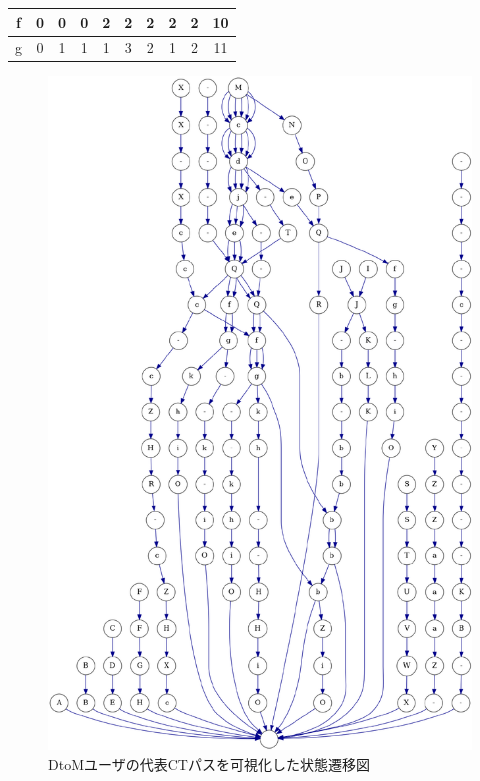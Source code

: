 \documentclass[submit,ses,noauthor]{ipsj}
\begin{document}
\begin{table}[h]
\begin{minipage}[t]{0.55\linewidth}
\begin{tabular}{c|c|cccccccc}
f                   & 0                                           & \multicolumn{1}{c|}{0} & \multicolumn{1}{c|}{0} & \multicolumn{1}{c|}{2} & \multicolumn{1}{c|}{2} & \multicolumn{1}{c|}{2} & \multicolumn{1}{c|}{2} & \multicolumn{1}{c|}{2} & 10  \\ \hline
g                   & 0                                           & \multicolumn{1}{c|}{1} & \multicolumn{1}{c|}{1} & \multicolumn{1}{c|}{1} & \multicolumn{1}{c|}{3} & \multicolumn{1}{c|}{2} & \multicolumn{1}{c|}{1} & \multicolumn{1}{c|}{2} & 11 \\ \hline
\end{tabular}
  \end{minipage}
\end{table}

\begin{figure}[t]
	\centering
	\includegraphics[width=0.8\linewidth]{Okamoto_fig/digraph-dtom.pdf}
        \vspace{-5mm}
	\caption{DtoMユーザの代表CTパスを可視化した状態遷移図}
	\label{fig:digraph-dtom}
\end{figure}
\end{document}
